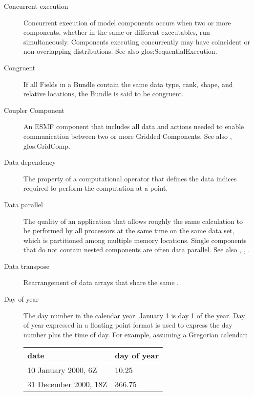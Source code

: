 \begin{description}
\label{glos:ConcurrentExecution}
\item[Concurrent execution] 
  Concurrent execution of model components occurs when two or more components,
  whether in the same or different executables, run simultaneously.
  Components executing concurrently may have coincident or 
  non-overlapping distributions.  See also 
  {glos:SequentialExecution}.

\label{glos:Congruent}
\item[Congruent] 
  If all Fields in a Bundle contain the same data type, rank, shape, and 
  relative locations, the Bundle is said to be congruent. 

\label{glos:Coupler}
\item[Coupler Component]
  An ESMF component that includes all data and actions needed to enable 
  communication between two or more Gridded Components. 
  See also , 
  {glos:GridComp}.

\label{glos:DataDep}
\item[Data dependency] The property of a computational
  operator that defines the data indices required to perform
  the computation at a point.  

\label{glos:DataParallel}
\item[Data parallel] The quality of an application that allows roughly 
  the same calculation to be performed by all processors at the same 
  time on the same data set, which is partitioned among multiple memory 
  locations.  Single components that do not contain nested components
  are often data parallel.  See also 
  , , 
  .   

\label{glos:DataTranspose}
\item[Data transpose] Rearrangement of data arrays that share the 
  same .  

\label{glos:DayOfYear}
\item[Day of year] The day number in the calendar year. 
  January 1 is day 1 of the year. Day of year expressed in a floating point 
  format is used to express the day number plus the time of day. 
  For example, assuming a Gregorian calendar:

\begin{tabular}{ll}
  {\bf date}              & {\bf day of year} \\
  \hline 
  10 January 2000, 6Z     & 10.25 \\
  31 December 2000, 18Z   & 366.75 
\end{tabular}


\end{description}
